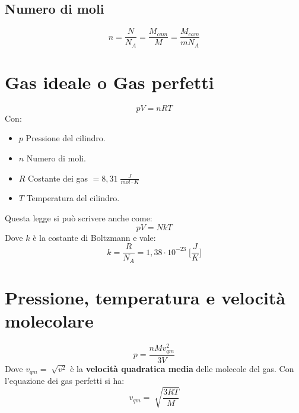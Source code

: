         \subsection*{Numero di moli}
            \begin{equation*}
                n = \frac{N}{N_A} = \frac{M_{cam}}{M} = \frac{M_{cam}}{mN_A}
            \end{equation*}

    \section*{Gas ideale o Gas perfetti} 
        \begin{equation*}
            pV = nRT
        \end{equation*}
    Con:
        \begin{itemize}
            \item $p$ Pressione del cilindro.
            \item $n$ Numero di moli.
            \item $R$ Costante dei gas $= 8,31 \; \frac{J}{mol \cdot K}$
            \item $T$ Temperatura del cilindro.
        \end{itemize}
    Questa legge si può scrivere anche come:
        \begin{equation*}
            pV = NkT
        \end{equation*}
    Dove $k$ è la costante di Boltzmann e vale:
        \begin{equation*}
            k = \frac{R}{N_A} = 1,38 \cdot 10^{-23} \; \Bigg[\frac{J}{K}\Bigg]
        \end{equation*}

    \section*{Pressione, temperatura e velocità molecolare}
            \begin{equation*}
                p = \frac{nMv^2_{qm}}{3V}
            \end{equation*}
    Dove $v_{qm} = \sqrt[]{v^2}$ è la \textbf{velocità quadratica media} delle
    molecole del gas. Con l'equazione dei gas perfetti si ha:
            \begin{equation*}
                v_{qm} = \sqrt[]{\frac{3RT}{M}}
            \end{equation*}